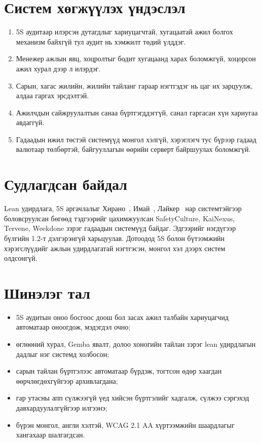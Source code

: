 \section*{Систем хөгжүүлэх үндэслэл}
\begin{enumerate}[nosep]
    \item 5S аудитаар илэрсэн дутагдлыг хариуцагчтай, хугацаатай ажил болгох механизм байхгүй тул аудит нь хэмжилт төдий үлддэг.
    \item Менежер ажлын явц, хоцролтыг бодит хугацаанд харах боломжгүй, хоцорсон ажил хурал дээр л илэрдэг.
    \item Сарын, хагас жилийн, жилийн тайланг гараар нэгтгэдэг нь цаг их зарцуулж, алдаа гаргах эрсдэлтэй.
    \item Ажилчдын сайжруулалтын санаа бүртгэгддэггүй, санал гаргасан хүн хариугаа авдаггүй.
    \item Гадаадын ижил төстэй системүүд монгол хэлгүй, хэрэглэгч тус бүрээр гадаад валютаар төлбөртэй, байгууллагын өөрийн серверт байршуулах боломжгүй.
\end{enumerate}

\section*{Судлагдсан байдал}
Lean удирдлага, 5S аргачлалыг Хирано~\cite{hirano}, Имай~\cite{imai}, Лайкер~\cite{liker} нар системтэйгээр боловсруулсан бөгөөд тэдгээрийг цахимжуулсан SafetyCulture, KaiNexus, Tervene, Weekdone зэрэг гадаадын системүүд байдаг. Эдгээрийг нэгдүгээр бүлгийн 1.2-т дэлгэрэнгүй харьцуулав. Дотоодод 5S болон бүтээмжийн хэрэгслүүдийг ажлын удирдлагатай нэгтгэсэн, монгол хэл дээрх систем олдсонгүй.

\section*{Шинэлэг тал}
\begin{itemize}
    \item 5S аудитын оноо босгоос доош бол засах ажил талбайн хариуцагчид автоматаар оноогдож, мэдэгдэл очно;
    \item өглөөний хурал, Gemba явалт, долоо хоногийн тайлан зэрэг lean удирдлагын дадлыг нэг системд холбосон;
    \item сарын тайлан бүртгэлээс автоматаар бүрдэж, тогтсон өдөр хаагдан өөрчлөгдөхгүйгээр архивлагдана;
    \item гар утасны апп сүлжээгүй үед хийсэн бүртгэлийг хадгалж, сүлжээ сэргэхэд давхардуулалгүйгээр илгээнэ;
    \item бүрэн монгол, англи хэлтэй, WCAG 2.1 AA хүртээмжийн шаардлагыг хангахаар шалгагдсан.
\end{itemize}

